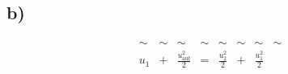 

\subsection*{b)}

\[
\begin{array}{cccccccc}
\sim & \sim & \sim & \sim & \sim & \sim & \sim & \sim \\
u_1 & + & \frac{u_{\text{auf}}^2}{2} & = & \frac{u_2^2}{2} & + & \frac{u_1^2}{2}
\end{array}
\]